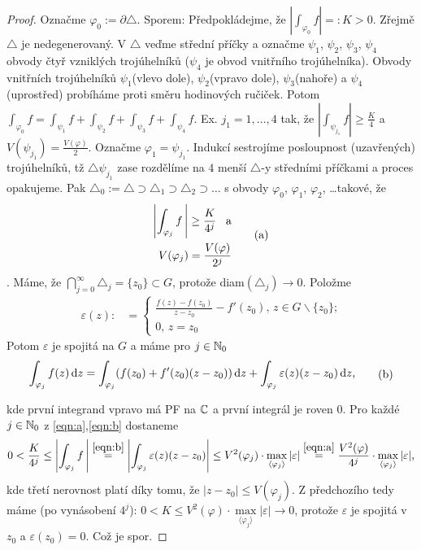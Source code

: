 \begin{proof}
Označme $\varphi_0:=\partial\triangle$. Sporem: Předpokládejme, že $|\int_{\varphi_0}f|=:K>0$. Zřejmě $\triangle$ je nedegenerovaný. V  $\triangle$ veďme střední příčky a označme $\psi_1$, $\psi_2$, $\psi_3$, $\psi_4$ obvody čtyř vzniklých trojúhelníků ($\psi_4$ je obvod vnitřního trojúhelníka). Obvody vnitřních trojúhelníků $\psi_1$(vlevo dole),  $\psi_2$(vpravo dole), $\psi_3$(nahoře) a  $\psi_4$(uprostřed) probíháme proti směru hodinových ručiček.
Potom $\int_{\varphi_0}f=\int_{\psi_1}f+\int_{\psi_2}f+\int_{\psi_3}f+\int_{\psi_4}f$. Ex. $j_1=1, \ldots, 4$ tak, že $|\int_{\psi_{j_1}}f|\ge \frac{K}{4}$ a $V({\psi_{j_1}})= \frac{V(\varphi)}{2}$.
Označme $\varphi_1=\psi_{j_1}$. Indukcí sestrojíme posloupnost (uzavřených) trojúhelníků, tž $\triangle \psi_{j_1}$ zase rozdělíme na $4$ menší $\triangle$-y středními příčkami a proces opakujeme. Pak 
$\triangle_0:=\triangle \supset \triangle_1 \supset \triangle_2 \supset \ldots$ s obvody $\varphi_0$, $\varphi_1$, $\varphi_2$, \ldots takové, že \begin{equation}
\begin{aligned}
        \left|\int_{\varphi_j}f\, \right|\ge \frac{K}{4^j} \text{\hspace{3mm}a}\\ V({\varphi_j})= \frac{V(\varphi)}{2^j}
\end{aligned}
\tag{a}
\label{eqn:a}
\end{equation}. Máme, že $\bigcap\limits_{j=0}^\infty \triangle_j=\{z_0\} \subset G$, %
protože diam$(\triangle_j)\rightarrow 0$. Položme
$$\begin{aligned}
\varepsilon(z): &=
\left\{
	\begin{array}{ll}
		\frac{f(z)-f(z_0)}{z-z_0}-f'(z_0) \text{, } z \in G \backslash \{z_0\} \text{;}\\
		0  \text{, } z=z_0
	\end{array}
\right.
\end{aligned}
$$
Potom $\varepsilon$ je spojitá na $G$ a máme pro $j \in \operatorname{\mathbb{N}}_0$
\begin{equation}
    \begin{aligned}
    \int_{\varphi_j}f(z) \mathop{}\!\mathrm{d} z = \int_{\varphi_j}(f(z_0)+f'(z_0)(z-z_0)) \mathop{}\!\mathrm{d} z + \int_{\varphi_j}\varepsilon(z)(z-z_0) \mathop{}\!\mathrm{d} z \text{,}
    \end{aligned}
    \tag{b}
    \label{eqn:b}
\end{equation}

kde první integrand vpravo má PF na $\operatorname{\mathbb{C}}  $ a první integrál je roven $0$. Pro každé $j \in \operatorname{\mathbb{N}}_0$ z  \cref{eqn:a},\cref{eqn:b} dostaneme
$$
0<\frac{K}{4^j} \le \left| \int_{\varphi_j}f\,\right|\stackrel{\cref{eqn:b}}{=} \left|\int_{\varphi_j}\varepsilon(z)(z-z_0)\right| \le V^2(\varphi_j) \cdot \max_{\langle\varphi_j\rangle}|\varepsilon|\overset{\cref{eqn:a}}{=}\frac{V^2(\varphi)}{4^j}\cdot \max_{\langle\varphi_j\rangle}|\varepsilon| \text{,}
$$
kde třetí nerovnost platí díky tomu, že $|z-z_0| \le V(\varphi_j)$. Z předchozího tedy máme (po vynásobení $4^j$): $0<K \le V^2(\varphi) \cdot \max\limits_{\langle\varphi_j\rangle}|\varepsilon| \rightarrow 0$, protože $\varepsilon$ je spojitá v $z_0$ a $\varepsilon(z_0)=0$. Což je spor.
\end{proof}
